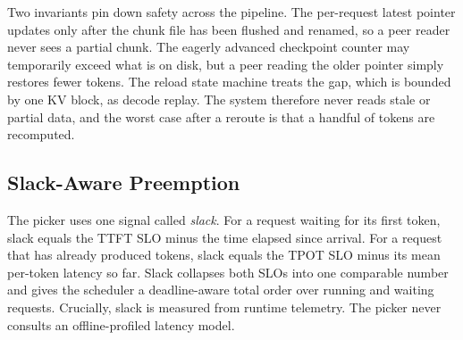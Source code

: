 
Two invariants pin down safety across the pipeline. The per-request latest pointer updates only after the chunk file has been flushed and renamed, so a peer reader never sees a partial chunk. The eagerly advanced checkpoint counter may temporarily exceed what is on disk, but a peer reading the older pointer simply restores fewer tokens. The reload state machine treats the gap, which is bounded by one KV block, as decode replay. The system therefore never reads stale or partial data, and the worst case after a reroute is that a handful of tokens are recomputed.

\subsection{Slack-Aware Preemption}


The picker uses one signal called \emph{slack}. For a request waiting for its first token, slack equals the TTFT SLO minus the time elapsed since arrival. For a request that has already produced tokens, slack equals the TPOT SLO minus its mean per-token latency so far. Slack collapses both SLOs into one comparable number and gives the scheduler a deadline-aware total order over running and waiting requests. Crucially, slack is measured from runtime telemetry. The picker never consults an offline-profiled latency model.


